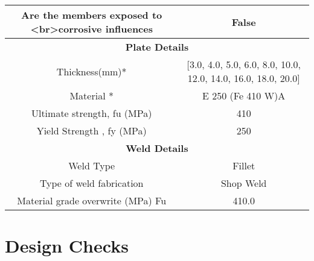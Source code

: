 \documentclass{article}%
\begin{document}
\begin{longtable}{|p{5cm}|p{2cm}|p{2cm}|p{2cm}|p{5cm}|}
\multicolumn{3}{|c|}{Are the members exposed to <br>corrosive influences}&\multicolumn{2}{|c|}{False}\\%
\hline%
\hline%
\multicolumn{5}{|c|}{\textbf{Plate Details}}\\%
\hline%
\hline%
\multicolumn{3}{|c|}{Thickness(mm)*}&\multicolumn{2}{|c|}{{[}3.0, 4.0, 5.0, 6.0, 8.0, 10.0, 12.0, 14.0, 16.0, 18.0, 20.0{]}}\\%
\hline%
\hline%
\multicolumn{3}{|c|}{Material *}&\multicolumn{2}{|c|}{E 250 (Fe 410 W)A}\\%
\hline%
\hline%
\multicolumn{3}{|c|}{Ultimate strength, fu (MPa)}&\multicolumn{2}{|c|}{410}\\%
\hline%
\hline%
\multicolumn{3}{|c|}{Yield Strength , fy (MPa)}&\multicolumn{2}{|c|}{250}\\%
\hline%
\hline%
\multicolumn{5}{|c|}{\textbf{Weld Details}}\\%
\hline%
\hline%
\multicolumn{3}{|c|}{Weld Type}&\multicolumn{2}{|c|}{Fillet}\\%
\hline%
\hline%
\multicolumn{3}{|c|}{Type of weld fabrication}&\multicolumn{2}{|c|}{Shop Weld}\\%
\hline%
\hline%
\multicolumn{3}{|c|}{Material grade overwrite (MPa) Fu}&\multicolumn{2}{|c|}{410.0}\\%
\hline%
\end{longtable}

%
%
\newpage%
\section{Design Checks}%
\label{sec:DesignChecks}%
\end{document}
